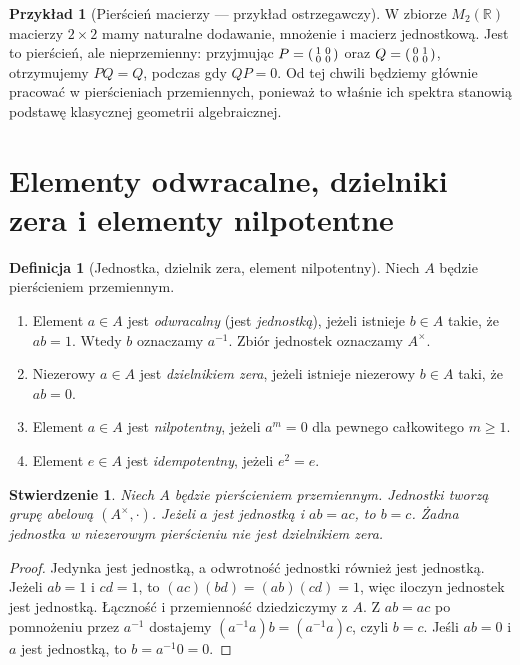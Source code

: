 \documentclass[11pt,a4paper,openany]{report}
\numberwithin{equation}{section}
\theoremstyle{plain}
\newtheorem{stwierdzenie}[twierdzenie]{Stwierdzenie}
\theoremstyle{definition}
\newtheorem{definicja}[twierdzenie]{Definicja}
\newtheorem{przyklad}[twierdzenie]{Przykład}
\theoremstyle{remark}
\newcommand{\R}{\mathbb R}
\begin{document}
\begin{przyklad}[Pierścień macierzy — przykład ostrzegawczy]
W zbiorze $M_2(\R)$ macierzy $2\times2$ mamy naturalne dodawanie,
mnożenie i macierz jednostkową. Jest to pierścień, ale nieprzemienny:
przyjmując
$P=\begin{psmallmatrix}1&0\\0&0\end{psmallmatrix}$ oraz
$Q=\begin{psmallmatrix}0&1\\0&0\end{psmallmatrix}$,
otrzymujemy $PQ=Q$, podczas gdy $QP=0$.
Od tej chwili będziemy głównie pracować w pierścieniach przemiennych,
ponieważ to właśnie ich spektra stanowią podstawę klasycznej geometrii
algebraicznej.
\end{przyklad}

\section{Elementy odwracalne, dzielniki zera i elementy nilpotentne}

\begin{definicja}[Jednostka, dzielnik zera, element nilpotentny]
Niech $A$ będzie pierścieniem przemiennym.
\begin{enumerate}[label=\arabic*)]
\item Element $a\in A$ jest \emph{odwracalny} (jest \emph{jednostką}),
jeżeli istnieje $b\in A$ takie, że $ab=1$. Wtedy $b$ oznaczamy $a^{-1}$.
Zbiór jednostek oznaczamy $A^\times$.
\item Niezerowy $a\in A$ jest \emph{dzielnikiem zera}, jeżeli istnieje
niezerowy $b\in A$ taki, że $ab=0$.
\item Element $a\in A$ jest \emph{nilpotentny}, jeżeli $a^m=0$
dla pewnego całkowitego $m\ge1$.
\item Element $e\in A$ jest \emph{idempotentny}, jeżeli $e^2=e$.
\end{enumerate}
\end{definicja}

\begin{stwierdzenie}
Niech $A$ będzie pierścieniem przemiennym. Jednostki tworzą grupę
abelową $(A^\times,\cdot)$. Jeżeli $a$ jest jednostką i $ab=ac$,
to $b=c$. Żadna jednostka w niezerowym pierścieniu nie jest dzielnikiem zera.
\end{stwierdzenie}
\begin{proof}
Jedynka jest jednostką, a odwrotność jednostki również jest jednostką.
Jeżeli $ab=1$ i $cd=1$, to $(ac)(bd)=(ab)(cd)=1$, więc iloczyn jednostek
jest jednostką. Łączność i przemienność dziedziczymy z $A$.
Z $ab=ac$ po pomnożeniu przez $a^{-1}$ dostajemy
$(a^{-1}a)b=(a^{-1}a)c$, czyli $b=c$.
Jeśli $ab=0$ i $a$ jest jednostką, to $b=a^{-1}0=0$.
\end{proof}
\end{document}
